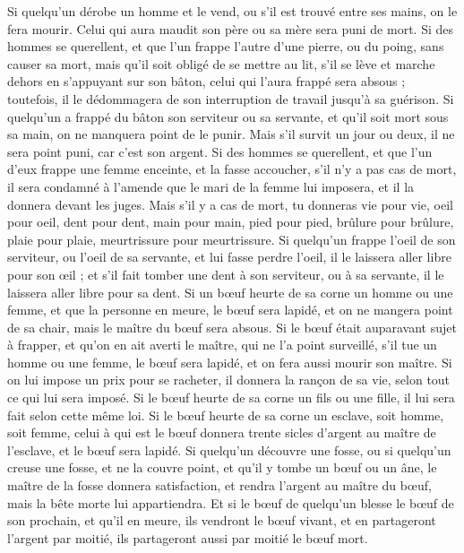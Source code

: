 \begin{multicols}{2}
Si quelqu'un dérobe un homme et le vend, ou s'il est trouvé entre ses mains, on le fera mourir.
Celui qui aura maudit son père ou sa mère sera puni de mort.
Si des hommes se querellent, et que l'un frappe l'autre d'une pierre, ou du poing, sans causer sa mort, mais qu'il soit obligé de se mettre au lit,
s'il se lève et marche dehors en s'appuyant sur son bâton, celui qui l'aura frappé sera absous ; toutefois, il le dédommagera de son interruption de travail jusqu’à sa guérison.
Si quelqu'un a frappé du bâton son serviteur ou sa servante, et qu'il soit mort sous sa main, on ne manquera point de le punir.
Mais s'il survit un jour ou deux, il ne sera point puni, car c'est son argent.
Si des hommes se querellent, et que l'un d'eux frappe une femme enceinte, et la fasse accoucher, s'il n'y a pas cas de mort, il sera condamné à l'amende que le mari de la femme lui imposera, et il la donnera devant les juges.
Mais s'il y a cas de mort, tu donneras vie pour vie,
oeil pour oeil, dent pour dent, main pour main, pied pour pied,
brûlure pour brûlure, plaie pour plaie, meurtrissure pour meurtrissure.
Si quelqu'un frappe l'oeil de son serviteur, ou l'oeil de sa servante, et lui fasse perdre l'oeil, il le laissera aller libre pour son œil ;
et s'il fait tomber une dent à son serviteur, ou à sa servante, il le laissera aller libre pour sa dent.
Si un bœuf heurte de sa corne un homme ou une femme, et que la personne en meure, le bœuf sera lapidé, et on ne mangera point de sa chair, mais le maître du bœuf sera absous.
Si le bœuf était auparavant sujet à frapper, et qu’on en ait averti le maître, qui ne l'a point surveillé, s'il tue un homme ou une femme, le bœuf sera lapidé, et on fera aussi mourir son maître.
Si on lui impose un prix pour se racheter, il donnera la rançon de sa vie, selon tout ce qui lui sera imposé.
Si le bœuf heurte de sa corne un fils ou une fille, il lui sera fait selon cette même loi.
Si le bœuf heurte de sa corne un esclave, soit homme, soit femme, celui à qui est le bœuf donnera trente sicles d'argent au maître de l'esclave, et le bœuf sera lapidé.
Si quelqu'un découvre une fosse, ou si quelqu'un creuse une fosse, et ne la couvre point, et qu'il y tombe un bœuf ou un âne,
le maître de la fosse donnera satisfaction, et rendra l'argent au maître du bœuf, mais la bête morte lui appartiendra.
Et si le bœuf de quelqu'un blesse le bœuf de son prochain, et qu'il en meure, ils vendront le bœuf vivant, et en partageront l'argent par moitié, ils partageront aussi par moitié le bœuf mort.

\end{multicols}
